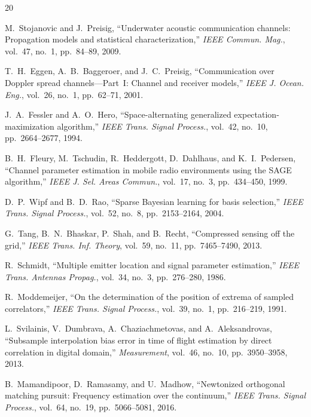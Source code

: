 \documentclass[journal]{IEEEtran}
\begin{document}
\begin{thebibliography}{20}

M.~Stojanovic and J.~Preisig, ``Underwater acoustic communication channels: Propagation models and statistical characterization,'' \textit{IEEE Commun. Mag.}, vol.~47, no.~1, pp.~84--89, 2009.

T.~H.~Eggen, A.~B.~Baggeroer, and J.~C.~Preisig, ``Communication over Doppler spread channels---Part~I: Channel and receiver models,'' \textit{IEEE J. Ocean. Eng.}, vol.~26, no.~1, pp.~62--71, 2001.

J.~A.~Fessler and A.~O.~Hero, ``Space-alternating generalized expectation-maximization algorithm,'' \textit{IEEE Trans. Signal Process.}, vol.~42, no.~10, pp.~2664--2677, 1994.

B.~H.~Fleury, M.~Tschudin, R.~Heddergott, D.~Dahlhaus, and K.~I.~Pedersen, ``Channel parameter estimation in mobile radio environments using the SAGE algorithm,'' \textit{IEEE J. Sel. Areas Commun.}, vol.~17, no.~3, pp.~434--450, 1999.

D.~P.~Wipf and B.~D.~Rao, ``Sparse Bayesian learning for basis selection,'' \textit{IEEE Trans. Signal Process.}, vol.~52, no.~8, pp.~2153--2164, 2004.

G.~Tang, B.~N.~Bhaskar, P.~Shah, and B.~Recht, ``Compressed sensing off the grid,'' \textit{IEEE Trans. Inf. Theory}, vol.~59, no.~11, pp.~7465--7490, 2013.

R.~Schmidt, ``Multiple emitter location and signal parameter estimation,'' \textit{IEEE Trans. Antennas Propag.}, vol.~34, no.~3, pp.~276--280, 1986.

R.~Moddemeijer, ``On the determination of the position of extrema of sampled correlators,'' \textit{IEEE Trans. Signal Process.}, vol.~39, no.~1, pp.~216--219, 1991.

L.~Svilainis, V.~Dumbrava, A.~Chaziachmetovas, and A.~Aleksandrovas, ``Subsample interpolation bias error in time of flight estimation by direct correlation in digital domain,'' \textit{Measurement}, vol.~46, no.~10, pp.~3950--3958, 2013.

B.~Mamandipoor, D.~Ramasamy, and U.~Madhow, ``Newtonized orthogonal matching pursuit: Frequency estimation over the continuum,'' \textit{IEEE Trans. Signal Process.}, vol.~64, no.~19, pp.~5066--5081, 2016.


\end{thebibliography}
\end{document}
